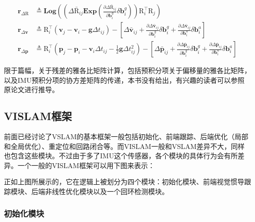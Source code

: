 \begin{equation}
\begin{aligned}
  \mathbf{r}_{\Delta\mathrm{R}}
    &\triangleq
      \bm{Log}\left(
        \left(
          \Delta\bar{\mathrm R}_{ij}
          \bm{Exp}\left(
            \frac{\partial\Delta\bar{\mathrm R}_{ij}}{\partial\mathbf{b}^g_i}
            \delta\mathbf{b}^g_i\right)
        \right) \mathrm{R}^\top_i \mathrm{R}_j
      \right) \\
  \mathbf{r}_{\Delta\mathbf{v}}
    &\triangleq
      \mathrm{R}^\top_i(\mathbf{v}_j - \mathbf{v}_i - \mathbf{g}\Delta t_{ij}) -
      \left[
        \Delta\bar{\mathbf v}_{ij} +
        \tfrac{\partial\Delta\bar{\mathbf v}_{ij}}{\partial\mathbf{b}^g_i}
        \delta\mathbf{b}^g_i +
        \tfrac{\partial\Delta\bar{\mathbf v}_{ij}}{\partial\mathbf{b}^a_i}
        \delta\mathbf{b}^a_i
      \right] \\
  \mathbf{r}_{\Delta\mathbf{p}}
    &\triangleq
      \mathrm{R}^\top_i(
        \mathbf{p}_j - \mathbf{p}_i -
        \mathbf{v}_i \Delta t_{ij} -
        \frac{1}{2}\mathbf{g}\Delta t^2_{ij}) -
      \left[
        \Delta\bar{\mathbf p}_{ij} +
        \tfrac{\partial\Delta\bar{\mathbf p}_{ij}}{\partial\mathbf{b}^g_i}
        \delta\mathbf{b}^g_i +
        \tfrac{\partial\Delta\bar{\mathbf p}_{ij}}{\partial\mathbf{b}^a_i}
        \delta\mathbf{b}^a_i \right]
\end{aligned}
\end{equation}

限于篇幅，关于残差的雅各比矩阵计算，包括预积分项关于偏移量的雅各比矩阵，以及IMU预积分项的协方差矩阵的传递，本书没有给出，有兴趣的读者可以参照原论文进行推导。

\subsection{VISLAM框架}

前面已经讨论了VSLAM的基本框架一般包括初始化、前端跟踪、后端优化（局部和全局优化）、重定位和回路闭合等。而VISLAM一般和VSLAM差异不大，同样也包含这些模块。不过由于多了IMU这个传感器，各个模块的具体行为会有所差异。一个一般的VISLAM框架可以用下图来表示：

正如上图所展示的，它在逻辑上被划分为四个模块：初始化模块、前端视觉惯导跟踪模块、后端非线性优化模块以及一个回环检测模块。

\subsubsection*{初始化模块}

